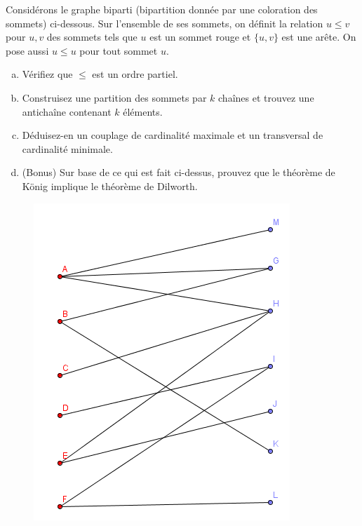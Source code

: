 \newpage
\begin{exo}
Consid\'erons le graphe biparti (bipartition donn\'ee par une coloration des sommets) ci-dessous. Sur l'ensemble de ses sommets, on d\'efinit la relation $u\leq v$ pour $u,v$ des sommets tels que $u$ est un sommet rouge et $\{u,v\}$ est une ar\^ete. On pose aussi $u\leq u$ pour tout sommet $u$. \\
\begin{enumerate}[(a)]
\item V\'erifiez que $\leq$ est un ordre partiel.
\item Construisez une partition des sommets par $k$ cha\^ines et trouvez une anticha\^ine contenant $k$ \'el\'ements.
\item D\'eduisez-en un couplage de cardinalit\'e maximale et un transversal de cardinalit\'e minimale. 
\item (Bonus) Sur base de ce qui est fait ci-dessus, prouvez que le th\'eor\`eme de K\"onig implique le th\'eor\`eme de Dilworth.
\end{enumerate}
\end{exo}

\begin{figure}[!h]
\begin{center}
\includegraphics{../Figures/Konig.png} 
\end{center}
\end{figure}